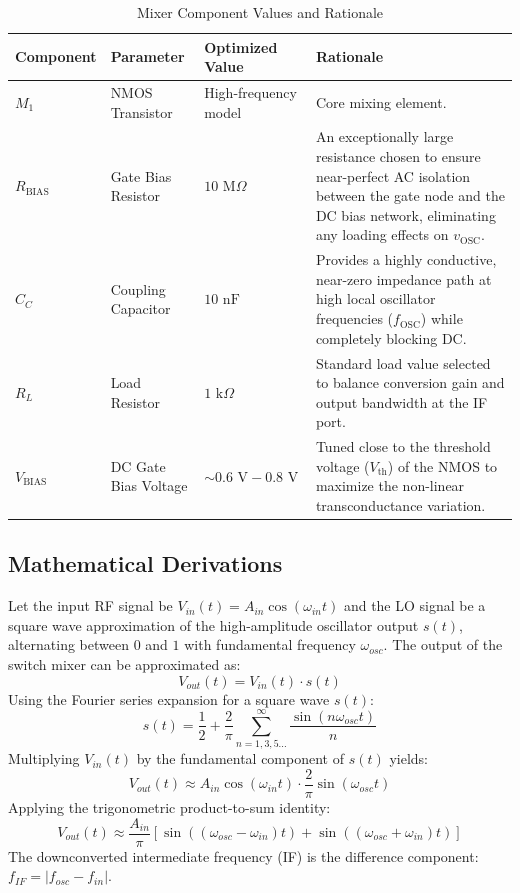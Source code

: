\documentclass[conference]{IEEEtran}
\begin{document}
\begin{table}[htbp]
    \centering
    \caption{Mixer Component Values and Rationale}
    \renewcommand{\arraystretch}{1.3}
    \begin{tabular}{@{}lllp{8cm}@{}}
        \toprule
        \textbf{Component} & \textbf{Parameter} & \textbf{Optimized Value} & \textbf{Rationale} \\ \midrule
        $M_1$ & NMOS Transistor & High-frequency model & Core mixing element. \\
        $R_{\text{BIAS}}$ & Gate Bias Resistor & $10\text{ M}\Omega$ & An exceptionally large resistance chosen to ensure near-perfect AC isolation between the gate node and the DC bias network, eliminating any loading effects on $v_{\text{OSC}}$. \\
        $C_C$ & Coupling Capacitor & $10\text{ nF}$ & Provides a highly conductive, near-zero impedance path at high local oscillator frequencies ($f_{\text{OSC}}$) while completely blocking DC. \\
        $R_L$ & Load Resistor & $1\text{ k}\Omega$ & Standard load value selected to balance conversion gain and output bandwidth at the IF port. \\
        $V_{\text{BIAS}}$ & DC Gate Bias Voltage & $\sim 0.6\text{ V} - 0.8\text{ V}$ & Tuned close to the threshold voltage ($V_{\text{th}}$) of the NMOS to maximize the non-linear transconductance variation. \\ \bottomrule
    \end{tabular}
    \label{tab:mixer_components}
\end{table}

\subsection{Mathematical Derivations}
Let the input RF signal be $V_{in}(t) = A_{in}\cos(\omega_{in} t)$ and the LO signal be a square wave approximation of the high-amplitude oscillator output $s(t)$, alternating between $0$ and $1$ with fundamental frequency $\omega_{osc}$. 
The output of the switch mixer can be approximated as:
\begin{equation}
    V_{out}(t) = V_{in}(t) \cdot s(t)
\end{equation}
Using the Fourier series expansion for a square wave $s(t)$:
\begin{equation}
    s(t) = \frac{1}{2} + \frac{2}{\pi} \sum_{n=1,3,5...}^{\infty} \frac{\sin(n\omega_{osc}t)}{n}
\end{equation}
Multiplying $V_{in}(t)$ by the fundamental component of $s(t)$ yields:
\begin{equation}
    V_{out}(t) \approx A_{in}\cos(\omega_{in}t) \cdot \frac{2}{\pi}\sin(\omega_{osc}t)
\end{equation}
Applying the trigonometric product-to-sum identity:
\begin{equation}
    V_{out}(t) \approx \frac{A_{in}}{\pi} [\sin((\omega_{osc} - \omega_{in})t) + \sin((\omega_{osc} + \omega_{in})t)]
\end{equation}
The downconverted intermediate frequency (IF) is the difference component: $f_{IF} = |f_{osc} - f_{in}|$.
\end{document}

